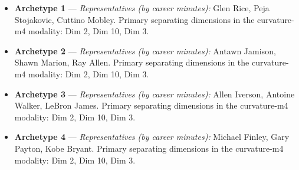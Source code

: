 \begin{itemize}
\item \textbf{Archetype 1} --- \emph{Representatives (by career minutes):} Glen Rice, Peja Stojakovic, Cuttino Mobley. Primary separating dimensions in the curvature-m4 modality: Dim 2, Dim 10, Dim 3.
\item \textbf{Archetype 2} --- \emph{Representatives (by career minutes):} Antawn Jamison, Shawn Marion, Ray Allen. Primary separating dimensions in the curvature-m4 modality: Dim 2, Dim 10, Dim 3.
\item \textbf{Archetype 3} --- \emph{Representatives (by career minutes):} Allen Iverson, Antoine Walker, LeBron James. Primary separating dimensions in the curvature-m4 modality: Dim 2, Dim 10, Dim 3.
\item \textbf{Archetype 4} --- \emph{Representatives (by career minutes):} Michael Finley, Gary Payton, Kobe Bryant. Primary separating dimensions in the curvature-m4 modality: Dim 2, Dim 10, Dim 3.
\end{itemize}
